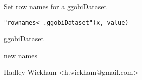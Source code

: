 \begin{Description}\relax
Set row names for a ggobiDataset
\end{Description}
\begin{Usage}
\begin{verbatim}"rownames<-.ggobiDataset"(x, value)\end{verbatim}
\end{Usage}
\begin{Arguments}
\begin{ldescription}
\item[\code{x}] ggobiDataset
\item[\code{value}] new names
\end{ldescription}
\end{Arguments}
\begin{Details}\relax
\end{Details}
\begin{Author}\relax
Hadley Wickham <h.wickham@gmail.com>
\end{Author}
\begin{Examples}
\begin{ExampleCode}\end{ExampleCode}
\end{Examples}

